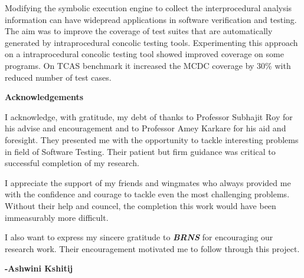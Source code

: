 \documentclass[12pt,oneside]{book}
\begin{document}
\vspace {0.5 cm}

Modifying the symbolic execution engine to collect the interprocedural analysis information can have widepread applications in software verification and testing. The aim was to improve the coverage of test suites that are automatically generated by intraprocedural concolic testing tools. Experimenting this approach on a intraprocedural concolic testing tool showed improved coverage on some programs. On TCAS benchmark it increased the MCDC coverage by 30\% with reduced number of test cases.    




\newpage

\begin{center}
\textbf{\Large{Acknowledgements}}
\end{center}

\vspace{1.0 cm}

I acknowledge, with gratitude, my debt of thanks to Professor Subhajit Roy for his advise and encouragement and to Professor Amey Karkare for his aid and foresight. They presented me with the opportunity to tackle interesting problems in field of Software Testing. Their patient but firm guidance was critical to successful completion of my research.  

\vspace{0.5 cm}

I appreciate the support of my friends and wingmates who always provided me with the confidence and courage to tackle even the most challenging problems. Without their help and councel, the completion this work would have been immeasurably more difficult. 

\vspace{1.0 cm}

I also want to express my sincere gratitude to \textit {\textbf {BRNS}} for encouraging our research work. Their encouragement motivated me to follow through this project.

\begin{flushright}
\textbf{-Ashwini Kshitij}
\end{flushright}

\newpage


\tableofcontents
\listoffigures
\listoftables
\end{document}
